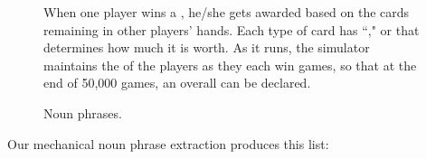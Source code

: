 \begin{figure}
{{\vspace{.1in}

\textsf{When one player wins a , he/she gets awarded
 based on the cards remaining in other players' hands. Each
type of card has ``," or  that
determines how much it is worth. As it runs, the simulator maintains the
 of the players as they each win games, so that at
the end of 50,000 games, an overall  can be declared.} }}

\vspace{.1in}
\caption{Noun phrases.}
\label{fig:unoNouns}
\end{figure}

Our mechanical noun phrase extraction produces this list:

